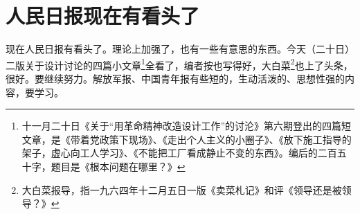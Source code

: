 \section[人民日报现在有看头了（一九六四年十二月二十日）]{人民日报现在有看头了}


现在人民日报有看头了。理论上加强了，也有一些有意思的东西。今天（二十日）二版关于设计讨论的四篇小文章\footnote{十一月二十日《关于“用革命精神改造设计工作”的讨沦》第六期登出的四篇短文章，是《带着党政策下现场》、《走出个人主义的小圈子》、《放下施工指导的架子，虚心向工人学习》、《不能把工厂看成静止不变的东西》。编后的二百五十字，题目是《根本问题在哪里？》}全看了，编者按也写得好，大白菜\footnote{大白菜报导，指一九六四年十二月五日一版《卖菜札记》和评《领导还是被领导？》}也上了头条，很好。要继续努力。解放军报、中国青年报有些短的，生动活泼的、思想性强的内容，要学习。

